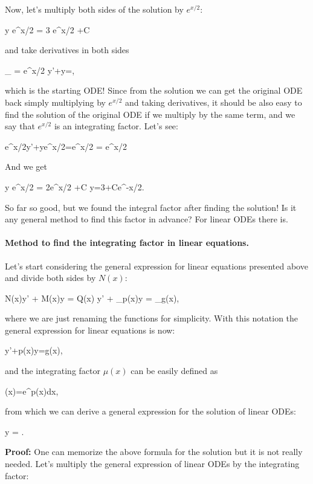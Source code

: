 Now, let's multiply both sides of the solution by $e^{x/2}$:

\bnn y e^{x/2} = 3 e^{x/2} +C \enn

and take derivatives in both sides

\bnn {}_{\small{}} = e^{x/2} \quad \rightarrow 	y'+y=, \enn

which is the starting ODE! Since from the solution we can get the original ODE back simply multiplying
by $e^{x/2}$ and taking derivatives, it should be also easy to find the solution of the original ODE if
we multiply by the same term, and we say that $e^{x/2}$ is an integrating factor. Let's see:

\bnn
	e^{x/2}y'+ye^{x/2}=e^{x/2} \quad \rightarrow \int {} = \int  {}e^{x/2}
\enn

And we get

\bnn
	y e^{x/2} =  2e^{x/2} +C  \quad \rightarrow y=3+Ce^{-x/2}.
\enn

So far so good, but we found the integral factor after finding the solution! Is it any general method to find this factor in advance? For linear ODEs there is.

\paragraph{Method to find the integrating factor in linear equations.} Let's start considering the general expression for linear equations presented above and divide both sides by $N(x)$:

\bnn N(x)y' + M(x)y = Q(x) \quad \rightarrow y' + _{p(x)}y = _{g(x)}, \enn

where we are just renaming the functions for simplicity. With this notation the general expression for linear equations is now:

\bnn
  y'+p(x)y=g(x),
\enn

and the integrating factor $\mu(x)$ can be easily defined as

\bnn
  \mu(x)=e^{\int p(x)dx},
\enn

from which we can derive a general expression for the solution of linear ODEs:

\bnn
	y = .
\enn

{\bf Proof:} One can memorize the above formula for the solution but it is not really needed. Let's multiply
the general expression of linear ODEs by the integrating factor:

